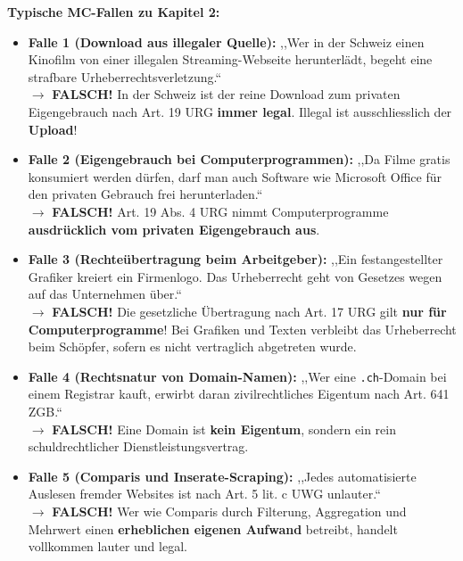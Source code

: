 \begin{important}
    \textbf{Typische MC-Fallen zu Kapitel 2:}
    \begin{itemize}
        \item \textbf{Falle 1 (Download aus illegaler Quelle):} ,,Wer in der Schweiz einen Kinofilm von einer illegalen Streaming-Webseite herunterlädt, begeht eine strafbare Urheberrechtsverletzung.`` \\
        $\rightarrow$ \textbf{FALSCH!} In der Schweiz ist der reine Download zum privaten Eigengebrauch nach Art. 19 URG \textbf{immer legal}. Illegal ist ausschliesslich der \textbf{Upload}!
        \item \textbf{Falle 2 (Eigengebrauch bei Computerprogrammen):} ,,Da Filme gratis konsumiert werden dürfen, darf man auch Software wie Microsoft Office für den privaten Gebrauch frei herunterladen.`` \\
        $\rightarrow$ \textbf{FALSCH!} Art. 19 Abs. 4 URG nimmt Computerprogramme \textbf{ausdrücklich vom privaten Eigengebrauch aus}.
        \item \textbf{Falle 3 (Rechteübertragung beim Arbeitgeber):} ,,Ein festangestellter Grafiker kreiert ein Firmenlogo. Das Urheberrecht geht von Gesetzes wegen auf das Unternehmen über.`` \\
        $\rightarrow$ \textbf{FALSCH!} Die gesetzliche Übertragung nach Art. 17 URG gilt \textbf{nur für Computerprogramme}! Bei Grafiken und Texten verbleibt das Urheberrecht beim Schöpfer, sofern es nicht vertraglich abgetreten wurde.
        \item \textbf{Falle 4 (Rechtsnatur von Domain-Namen):} ,,Wer eine \texttt{.ch}-Domain bei einem Registrar kauft, erwirbt daran zivilrechtliches Eigentum nach Art. 641 ZGB.`` \\
        $\rightarrow$ \textbf{FALSCH!} Eine Domain ist \textbf{kein Eigentum}, sondern ein rein schuldrechtlicher Dienstleistungsvertrag.
        \item \textbf{Falle 5 (Comparis und Inserate-Scraping):} ,,Jedes automatisierte Auslesen fremder Websites ist nach Art. 5 lit. c UWG unlauter.`` \\
        $\rightarrow$ \textbf{FALSCH!} Wer wie Comparis durch Filterung, Aggregation und Mehrwert einen \textbf{erheblichen eigenen Aufwand} betreibt, handelt vollkommen lauter und legal.
    \end{itemize}
\end{important}
